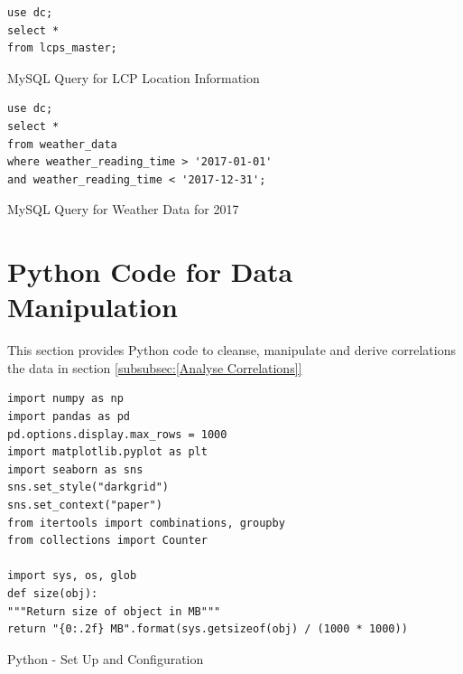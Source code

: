 \documentclass[12pt]{scrartcl}
\begin{document}
\begin{listing}[H]
\begin{verbatim}
use dc; 
select * 
from lcps_master;
\end{verbatim}
\caption{MySQL Query for LCP Location Information}
\label{list:[MySQL Query for LCP Location Information]}
\end{listing}

\begin{listing}[H]
\begin{verbatim}
use dc; 
select * 
from weather_data
where weather_reading_time > '2017-01-01'
and weather_reading_time < '2017-12-31';
\end{verbatim}
\caption{MySQL Query for Weather Data for 2017}
\label{list:[MySQL Query for Weather Data for 2017]}
\end{listing}

\section{Python Code for Data Manipulation}
\label{sec:[Python Code]}
This section provides Python code to cleanse, manipulate and derive correlations the data in section \ref{subsubsec:[Analyse Correlations]}

\begin{listing}[H]
\begin{verbatim}
import numpy as np
import pandas as pd
pd.options.display.max_rows = 1000
import matplotlib.pyplot as plt
import seaborn as sns
sns.set_style("darkgrid")
sns.set_context("paper")
from itertools import combinations, groupby
from collections import Counter

import sys, os, glob
def size(obj):
"""Return size of object in MB"""
return "{0:.2f} MB".format(sys.getsizeof(obj) / (1000 * 1000))
\end{verbatim}
\caption{Python - Set Up and Configuration}
\label{list:[Python - Set up and Configuration]}
\end{listing}
\end{document}

